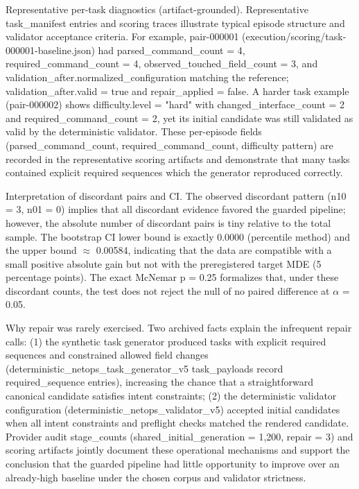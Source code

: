 \documentclass[conference]{IEEEtran}
\begin{document}
Representative per-task diagnostics (artifact-grounded). Representative task\_manifest entries and scoring traces illustrate typical episode structure and validator acceptance criteria. For example, pair-000001 (execution/scoring/task-000001-baseline.json) had parsed\_command\_count = 4, required\_command\_count = 4, observed\_touched\_field\_count = 3, and validation\_after.normalized\_configuration matching the reference; validation\_after.valid = true and repair\_applied = false. A harder task example (pair-000002) shows difficulty.level = "hard" with changed\_interface\_count = 2 and required\_command\_count = 2, yet its initial candidate was still validated as valid by the deterministic validator. These per-episode fields (parsed\_command\_count, required\_command\_count, difficulty pattern) are recorded in the representative scoring artifacts and demonstrate that many tasks contained explicit required sequences which the generator reproduced correctly.

Interpretation of discordant pairs and CI. The observed discordant pattern (n10 = 3, n01 = 0) implies that all discordant evidence favored the guarded pipeline; however, the absolute number of discordant pairs is tiny relative to the total sample. The bootstrap CI lower bound is exactly 0.0000 (percentile method) and the upper bound \ensuremath{\approx} 0.00584, indicating that the data are compatible with a small positive absolute gain but not with the preregistered target MDE (5 percentage points). The exact McNemar p = 0.25 formalizes that, under these discordant counts, the test does not reject the null of no paired difference at \ensuremath{\alpha} = 0.05.

Why repair was rarely exercised. Two archived facts explain the infrequent repair calls: (1) the synthetic task generator produced tasks with explicit required sequences and constrained allowed field changes (deterministic\_netops\_task\_generator\_v5 task\_payloads record required\_sequence entries), increasing the chance that a straightforward canonical candidate satisfies intent constraints; (2) the deterministic validator configuration (deterministic\_netops\_validator\_v5) accepted initial candidates when all intent constraints and preflight checks matched the rendered candidate. Provider audit stage\_counts (shared\_initial\_generation = 1,200, repair = 3) and scoring artifacts jointly document these operational mechanisms and support the conclusion that the guarded pipeline had little opportunity to improve over an already‑high baseline under the chosen corpus and validator strictness.
\end{document}
